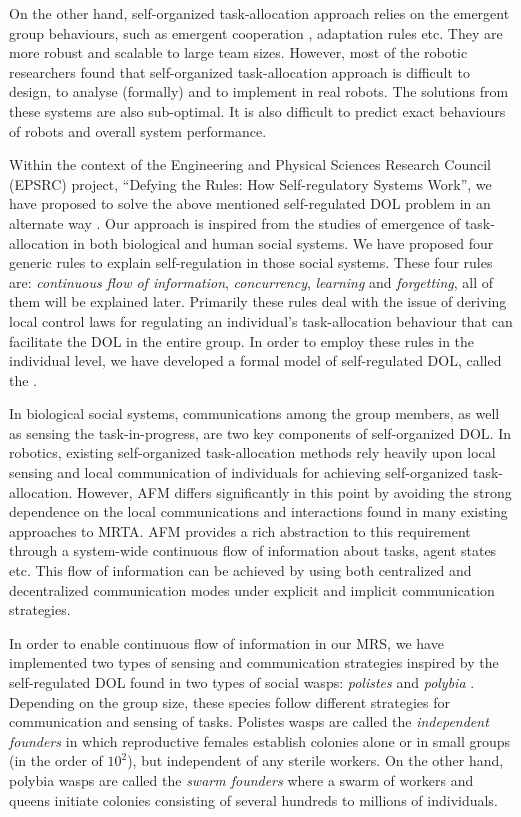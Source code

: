 \documentclass[preprint,12pt]{elsarticle}
\begin{document}
On the other hand, self-organized task-allocation approach relies on the emergent group behaviours, such as emergent cooperation \cite{Kube+1993}, adaptation rules \cite{Liu+2007} etc. They are more robust and scalable to large team sizes. However, most of the robotic researchers found that self-organized task-allocation approach is difficult to design, to analyse (formally) and to implement in real robots. The solutions from these systems are also sub-optimal. It is also difficult to predict exact behaviours of robots and overall system performance.

Within the context of the Engineering and Physical Sciences Research Council (EPSRC) project, ``Defying the Rules: How Self-regulatory Systems Work'', we have proposed to solve the above mentioned self-regulated DOL problem in an alternate way \cite{Arcaute+2008}. Our approach is inspired from the studies of emergence of task-allocation in both biological and human social systems. We have proposed four generic rules to explain self-regulation in those social systems. These four rules are: \textit{continuous flow of information}, \textit{concurrency}, \textit{learning} and \textit{forgetting}, all of them will be explained later. Primarily these rules deal with the issue of deriving local control laws for regulating an individual's task-allocation behaviour that can facilitate the DOL in the entire group. In order to  employ these rules in the individual level, we have developed a formal model of self-regulated DOL, called the .

In biological social systems, communications among the group members, as well as sensing the task-in-progress, are two key components of self-organized DOL. In robotics, existing self-organized task-allocation methods rely heavily upon local sensing and local communication of individuals for achieving self-organized task-allocation. However, AFM differs significantly in this point by avoiding the strong dependence on the local communications and interactions found in many existing approaches to MRTA. AFM provides a rich abstraction to this requirement through a system-wide continuous flow of information about tasks, agent states etc. This flow of information can be achieved by using both centralized and decentralized communication modes under explicit and implicit communication strategies.

In order to enable continuous flow of information in our \acl{MRS}, we have implemented two types of sensing and communication strategies inspired by the self-regulated DOL found in two types of social wasps: {\em polistes} and {\em polybia} \cite{Jeanne1999}. Depending on the group size, these species follow different strategies for communication and sensing of tasks. Polistes wasps are called the {\em independent founders} in which reproductive females establish colonies alone or in small groups (in the order of $10^2$), but independent of any sterile workers. On the other hand, polybia wasps are called the {\em swarm founders} where a swarm of workers and queens initiate colonies consisting of several hundreds to millions of individuals.
\end{document}
